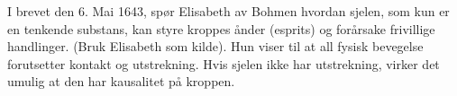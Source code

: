 I brevet den 6. Mai 1643, spør Elisabeth av Bohmen hvordan sjelen, som kun er en tenkende substans, kan styre kroppes ånder (esprits) og forårsake frivillige handlinger. (Bruk Elisabeth som kilde). Hun viser til at all fysisk bevegelse forutsetter kontakt og utstrekning. Hvis sjelen ikke har utstrekning, virker det umulig at den har kausalitet på kroppen. \\